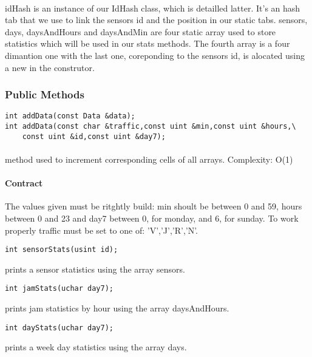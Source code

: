 \documentclass[a4paper, 12pts]{article}
\begin{document}
\paragraph{}
	idHash is an instance of our IdHash class, which is detailled latter. It's an hash tab that we use to link the sensors id and the position in our static tabs.
	sensors, days, daysAndHours and daysAndMin are four static array used to store statistics which will be used in our stats methods. The fourth array is a four dimantion one with the last one, coreponding to the sensors id, is alocated using a new in the construtor.

\subsubsection{Public Methods}

\begin{lstlisting}
int addData(const Data &data);
int addData(const char &traffic,const uint &min,const uint &hours,\
	const uint &id,const uint &day7);
\end{lstlisting}
\paragraph{}
	method used to increment corresponding cells of all arrays. Complexity: O(1)
\paragraph{Contract}
	The values given must be ritghtly build: min shoult be between 0 and 59, hours between 0 and 23 and day7 between 0, for monday, and 6, for sunday. To work properly traffic must be set to one of: 'V','J','R','N'.
\begin{lstlisting}
int sensorStats(usint id);
\end{lstlisting}
prints a sensor statistics using the array sensors.
\begin{lstlisting}
int jamStats(uchar day7);
\end{lstlisting}
prints jam statistics by hour using the array daysAndHours.
\begin{lstlisting}
int dayStats(uchar day7);
\end{lstlisting}
prints a week day statistics using the array days.
\end{document}
